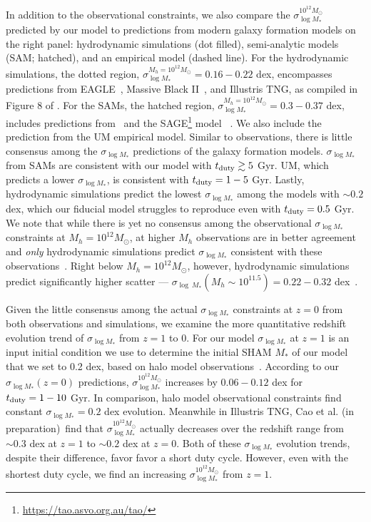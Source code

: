 \documentclass[12pt, letterpaper, preprint, tighten]{aastex62}
\newcommand{\edt}[1]{{\color{dred}{\bf} #1}}
\newcommand{\cao}{Cao et al. (in preparation)}
\newcommand{\siglogm}{\sigma_{\log M_*}}
\begin{document}
In addition to the observational constraints, we also compare the $\siglogm^{10^{12}M_\odot}$
predicted by our model to predictions from modern galaxy formation models
on the right panel: hydrodynamic simulations (dot filled), semi-analytic models
(SAM; hatched), and an empirical model (dashed line). For the hydrodynamic 
simulations, the dotted region, $\siglogm^{M_h=10^{12}M_\odot} = 0.16 - 0.22$ dex, encompasses
predictions from EAGLE~\citep{matthee2017}, Massive Black II~\citep{khandai2015},
and Illustris TNG, as compiled in Figure 8 of \cite{wechsler2018}.
For the SAMs, the hatched region, $\siglogm^{M_h=10^{12}M_\odot} = 0.3 - 0.37$ dex, includes predictions 
from~\cite{lu2014, somerville2012} and the SAGE\footnote{\url{https://tao.asvo.org.au/tao/}}
model~\edt{\citep{croton2016}}. We also include the prediction from the
\cite{behroozi2018} UM empirical model. 
\edt{Similar to observations, there is little consensus among the $\siglogm$ 
predictions of the galaxy formation models.} 
$\siglogm$ from SAMs are consistent with our model with $t_{\rm duty} \gtrsim 5$ Gyr. 
UM, which predicts a lower $\siglogm$, is consistent with $t_{\rm duty} = 1 - 5$ Gyr.
Lastly, hydrodynamic simulations predict the lowest $\siglogm$ among the models
\edt{with $\sim 0.2$ dex, which our fiducial model struggles to reproduce
even with $t_{\rm duty} = 0.5$ Gyr}. 
\edt{We note that while there is yet no consensus among the observational 
$\siglogm$ constraints at $M_h=10^{12} M_\odot$, at higher $M_h$ observations 
are in better agreement and {\em only} hydrodynamic simulations predict $\siglogm$
consistent with these observations~\citep{wechsler2018}. Right below 
$M_h=10^{12}M_\odot$, however, hydrodynamic simulations predict significantly higher 
scatter --- $\sigma_{\log~M_*}(M_h\sim 10^{11.5}) = 0.22 - 0.32$ dex~\citep{wechsler2018}.}

\edt{Given the little consensus among the actual $\siglogm$ constraints at $z=0$ 
from both observations and simulations, we examine the more quantitative redshift 
evolution trend of $\siglogm$ from $z=1$ to 0. For our model $\siglogm$ at $z=1$ 
is an input initial condition we
use to determine the initial SHAM $M_*$ of our model that we set to 0.2 dex, based 
on halo model observations~\citep[\emph{e.g.}][]{leauthaud2012, tinker2013, patel2015}. 
According to our $\siglogm(z=0)$ predictions, $\siglogm^{10^{12}M_\odot}$ increases 
by $0.06 - 0.12$ dex for $t_{\rm duty} = 1-10$ Gyr. In comparison, halo model observational constraints find 
constant $\siglogm=0.2$ dex evolution. Meanwhile in Illustris TNG, \cao~find that 
$\siglogm^{10^{12}M_\odot}$ actually decreases over the redshift range from 
$\sim 0.3$ dex at $z=1$ to $\sim 0.2$ dex at $z=0$. Both of these $\siglogm$ evolution 
trends, despite their difference, favor favor a short duty cycle. However, even with the 
shortest duty cycle, we find an increasing $\siglogm^{10^{12}M_\odot}$ from $z=1$. 
} 
\end{document}
